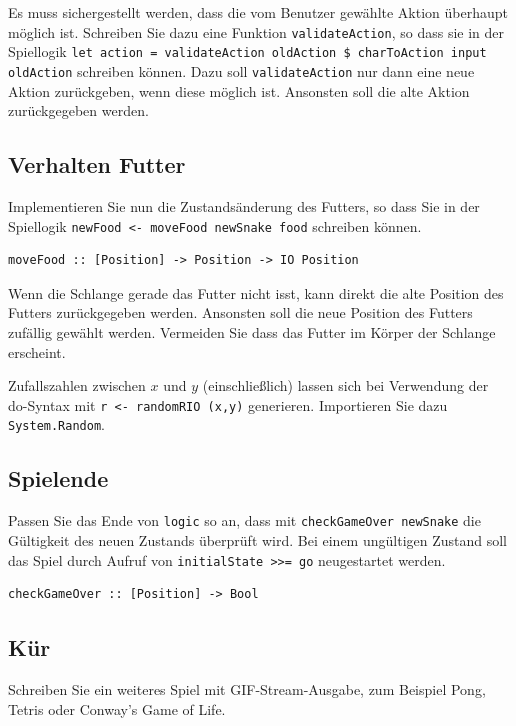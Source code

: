 \documentclass{scrartcl}
\begin{document}
Es muss sichergestellt werden, dass die vom Benutzer gewählte Aktion überhaupt möglich ist.
Schreiben Sie dazu eine Funktion \texttt{validateAction}, so dass sie in der Spiellogik \texttt{let action = validateAction oldAction \$ charToAction input oldAction} schreiben können.
Dazu soll \texttt{validateAction} nur dann eine neue Aktion zurückgeben, wenn diese möglich ist.
Ansonsten soll die alte Aktion zurückgegeben werden.


\subsection{Verhalten Futter}
Implementieren Sie nun die Zustandsänderung des Futters, so dass Sie in der Spiellogik \texttt{newFood <- moveFood newSnake food} schreiben können.

\begin{lstlisting}
moveFood :: [Position] -> Position -> IO Position
\end{lstlisting}

Wenn die Schlange gerade das Futter nicht isst, kann direkt die alte Position des Futters zurückgegeben werden.
Ansonsten soll die neue Position des Futters zufällig gewählt werden.
Vermeiden Sie dass das Futter im Körper der Schlange erscheint.

Zufallszahlen zwischen $x$ und $y$ (einschließlich) lassen sich bei Verwendung der do-Syntax mit \texttt{r <- randomRIO (x,y)} generieren.
Importieren Sie dazu \texttt{System.Random}.

\subsection{Spielende}
Passen Sie das Ende von \texttt{logic} so an, dass mit \texttt{checkGameOver newSnake} die Gültigkeit des neuen Zustands überprüft wird.
Bei einem ungültigen Zustand soll das Spiel durch Aufruf von \texttt{initialState >>= go} neugestartet werden.

\begin{lstlisting}
checkGameOver :: [Position] -> Bool
\end{lstlisting}

\subsection{Kür}
Schreiben Sie ein weiteres Spiel mit GIF-Stream-Ausgabe, zum Beispiel Pong, Tetris oder Conway's Game of Life.
\end{document}
